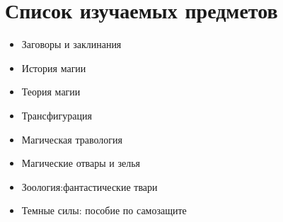 \documentclass[14pt, a4paper]{article}
\begin{document}
\section{Список изучаемых предметов}
\newcommand*{\MePoint}{\texttt{[image: halloween\_hat-5.png]}}
\renewcommand{\labelitemi}{\MePoint}
\begin{itemize}
\item Заговоры и заклинания
\item История магии
\item Теория магии
\item Трансфигурация
\item Магическая травология
\item Магические отвары и зелья
\item Зоология:фантастические твари
\item Темные силы: пособие по самозащите
\end{itemize}
\end{document}

